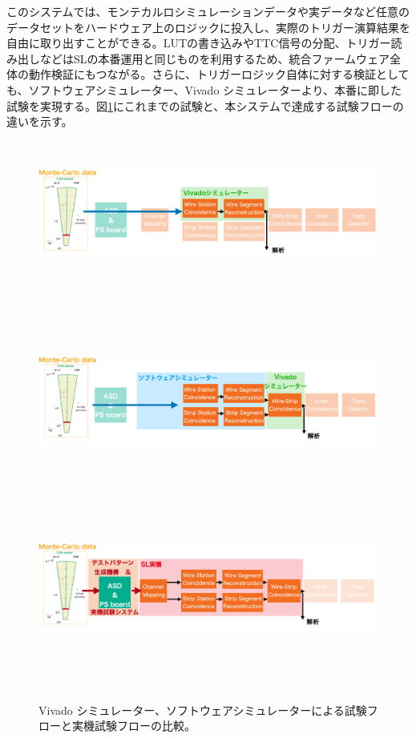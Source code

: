 このシステムでは、モンテカルロシミュレーションデータや実データなど任意のデータセットをハードウェア上のロジックに投入し、実際のトリガー演算結果を自由に取り出すことができる。LUTの書き込みやTTC信号の分配、トリガー読み出しなどはSLの本番運用と同じものを利用するため、統合ファームウェア全体の動作検証にもつながる。さらに、トリガーロジック自体に対する検証としても、ソフトウェアシミュレーター、Vivado シミュレーターより、本番に即した試験を実現する。図\ref{Test_Flow}にこれまでの試験と、本システムで達成する試験フローの違いを示す。

\begin{figure}
    \begin{minipage}[b]{0.9\linewidth}
    \centering
    \includegraphics[height=4.8cm]{fig/Test/Flow_Wire.png}
    \end{minipage}\\
    \begin{minipage}[b]{0.9\linewidth}
        \centering
        \includegraphics[height=4.8cm]{fig/Test/Flow_WS.png}
    \end{minipage}\\
        \begin{minipage}[b]{0.9\linewidth}
            \centering
            \includegraphics[height=4.8cm]{fig/Test/Flow_zikki.png}
        \end{minipage}\\
    
    \caption[試験フロー]{Vivado シミュレーター、ソフトウェアシミュレーターによる試験フローと実機試験フローの比較。}
    \label{Test_Flow}
\end{figure}


